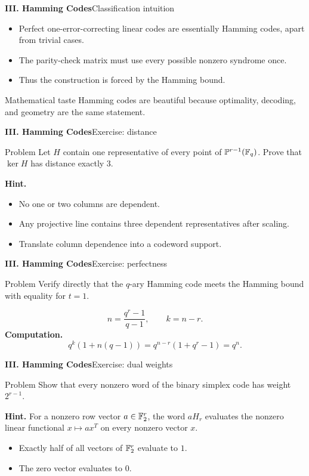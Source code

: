 \begin{frame}{\textbf{III. Hamming Codes}}{Classification intuition}
\small
\begin{itemize}
  \item Perfect one-error-correcting linear codes are essentially Hamming codes, apart from trivial cases.
  \item The parity-check matrix must use every possible nonzero syndrome once.
  \item Thus the construction is forced by the Hamming bound.
\end{itemize}
\begin{block}{Mathematical taste}
Hamming codes are beautiful because optimality, decoding, and geometry are the same statement.
\end{block}
\end{frame}

\begin{frame}{\textbf{III. Hamming Codes}}{Exercise: distance}
\small
\begin{block}{Problem}
Let $H$ contain one representative of every point of $\mathbb{P}^{r-1}(\mathbb{F}_q)$. Prove that $\ker H$ has distance exactly $3$.
\end{block}
\textbf{Hint.}
\begin{itemize}
  \item No one or two columns are dependent.
  \item Any projective line contains three dependent representatives after scaling.
  \item Translate column dependence into a codeword support.
\end{itemize}
\end{frame}

\begin{frame}{\textbf{III. Hamming Codes}}{Exercise: perfectness}
\small
\begin{block}{Problem}
Verify directly that the $q$-ary Hamming code meets the Hamming bound with equality for $t=1$.
\end{block}
\[
  n=\frac{q^r-1}{q-1},\qquad k=n-r.
\]
\textbf{Computation.}
\[
  q^k(1+n(q-1))=q^{n-r}(1+q^r-1)=q^n.
\]
\end{frame}

\begin{frame}{\textbf{III. Hamming Codes}}{Exercise: dual weights}
\small
\begin{block}{Problem}
Show that every nonzero word of the binary simplex code has weight $2^{r-1}$.
\end{block}
\textbf{Hint.}
For a nonzero row vector $a\in\mathbb{F}_2^r$, the word $aH_r$ evaluates the nonzero linear functional $x\mapsto ax^T$ on every nonzero vector $x$.
\begin{itemize}
  \item Exactly half of all vectors of $\mathbb{F}_2^r$ evaluate to $1$.
  \item The zero vector evaluates to $0$.
\end{itemize}
\end{frame}

